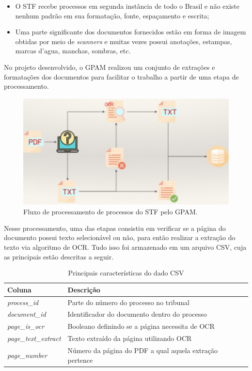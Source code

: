\begin{itemize}
  \item O STF recebe processos em segunda instância de todo o Brasil e não existe nenhum padrão em sua formatação, fonte, espaçamento e escrita;
  \item Uma parte significante dos documentos fornecidos estão em forma de imagem obtidas por meio de \textit{scanners} e muitas vezes possui anotações, estampas, marcas d'agua, manchas, sombras, etc.
\end{itemize}


No projeto desenvolvido, o GPAM realizou um conjunto de extrações e formatações dos documentos para facilitar o trabalho a partir de uma etapa de processamento.

\begin{figure}[H]
  \includegraphics[width=13cm, center]{figuras/gpan-pipeline.png}
  \caption{Fluxo de processamento de processos do STF pelo GPAM.}
  \label{fig:gpan-pipeline}
\end{figure}

Nesse processamento, uma das etapas consistiu em verificar se a página do documento possui texto selecionável ou não, para então realizar a extração do texto via algoritmo de OCR. Tudo isso foi armazenado em um arquivo CSV, cuja as principais estão descritas a seguir.


\begin{table}[h]
 \centering
 \caption{Principais características do dado CSV}
 \begin{tabular}{|m{9em}|m{20em}|}
    \hline
      \textbf{Coluna}  &
      \textbf{Descrição} \\
    \hline
      \textit{process\_id}  &
      Parte do número do processo no tribunal \\
    \hline
      \textit{document\_id}  &
      Identificador do documento dentro do processo \\
    \hline
      \textit{page\_is\_ocr}  &
      Booleano definindo se a página necessita de OCR \\
    \hline
      \textit{page\_text\_extract} &
      Texto extraído da página utilizando OCR \\
    \hline
      \textit{page\_number} &
      Número da página do PDF a qual aquela extração pertence \\
    \hline
 \end{tabular}
 \label{tab:csv-details}
\end{table}

